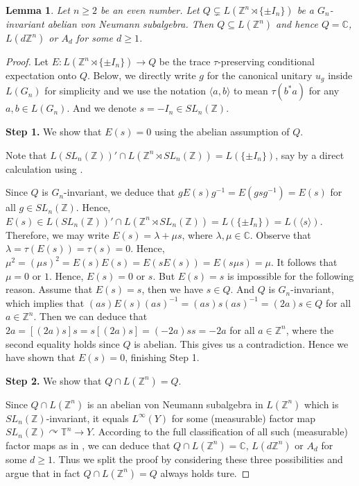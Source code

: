 \documentclass[12pt]{amsart}
\newtheorem{lem}[theorem]{Lemma}
\theoremstyle{definition}
\theoremstyle{remark}
\begin{document}
\begin{lem}\label{3.5}Let $n\geq 2$ be an even number.
Let $Q\subsetneq L(\mathbb{Z}^{n} \rtimes \{\pm I_{n}\})$ be a $G_{n}$-invariant abelian von Neumann subalgebra. Then $Q\subseteq L(\mathbb{Z}^n)$ and hence $Q=\mathbb{C}$, $L(d\mathbb{Z}^n)$ or $A_d$ for some $d\geq 1$.    
\end{lem}
\begin{proof}
Let $E: L(\mathbb{Z}^n\rtimes \{\pm{I_{n}}\})\rightarrow Q$ be the trace $\tau$-preserving conditional expectation onto $Q$. Below, we directly write $g$ for the canonical unitary $u_g$ inside $L(G_{n})$ for simplicity and we use the notation $\langle a, b \rangle$ to mean $\tau(b^*a)$  for any $a, b\in L(G_{n})$. And we denote $s=-I_{n}\in SL_{n}(\mathbb{Z})$.

\textbf{Step 1.} We show that $E(s)=0$ using the abelian assumption of $Q$.

Note that $L(SL_n(\mathbb{Z}))'\cap L(\mathbb{Z}^n\rtimes SL_n(\mathbb{Z}))=L(\{\pm I_{n}\})$, say by a direct calculation using \cite[Lemma 2.7]{aj}.


Since $Q$ is $G_{n}$-invariant, we deduce that $gE(s)g^{-1}=E(gsg^{-1})=E(s)$ for all $g\in SL_n(\mathbb{Z})$. Hence, 
$E(s)\in L(SL_n(\mathbb{Z}))'\cap L(\mathbb{Z}^n\rtimes SL_n(\mathbb{Z}))=L(\{\pm I_{n}\})=L(\langle s\rangle)$. Therefore, we may write $E(s)=\lambda+\mu s$, where $\lambda,\mu\in\mathbb{C}$. Observe that $\lambda=\tau(E(s))=\tau(s)=0$. Hence, $\mu^2=(\mu s)^2=E(s)E(s)=E(sE(s))=E(s\mu s)=\mu$. It follows that $\mu=0$ or $1$. Hence, $E(s)=0$ or $s$. But $E(s)=s$ is impossible for the following reason. Assume that $E(s)=s$, then we have $s\in Q$. And $Q$ is $G_{n}$-invariant, which implies that $(as)E(s)(as)^{-1} = (as)s(as)^{-1} =(2a)s\in Q$ for all $a\in \mathbb{Z}^{n}$.
Then we can deduce that $2a = [(2a)s]s=s[(2a)s]=(-2a)ss=-2a$ for all $a\in \mathbb{Z}^{n}$, where the second equality holds since $Q$ is abelian. This gives us a contradiction. Hence we have shown that $E(s)=0$, finishing Step 1.

\textbf{Step 2.} We show that $Q\cap L(\mathbb{Z}^n)=Q$.

Since $Q\cap L(\mathbb{Z}^n)$ is an abelian von Neumann subalgebra in $L(\mathbb{Z}^n)$ which is $SL_n(\mathbb{Z})$-invariant, it equals $L^{\infty}(Y)$ for some (measurable) factor map $SL_n(\mathbb{Z})\curvearrowright \mathbb{T}^n\rightarrow Y$. According to the full classification of all such (measurable) factor maps as in
 \cite[Example 5.9]{wit}, we can deduce that $Q\cap L(\mathbb{Z}^n)=\mathbb{C}$, $L(d\mathbb{Z}^n)$ or $A_d$ for some $d\geq 1$. Thus we split the proof by considering these three possibilities and argue that in fact $Q\cap L(\mathbb{Z}^n)=Q$ always holds ture.


\end{proof}
\end{document}
